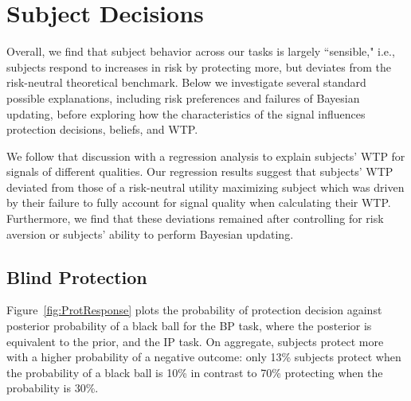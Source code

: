\section{Subject Decisions}\label{app:subtasks}



Overall, we find that subject behavior across our tasks is largely ``sensible," i.e., subjects respond to increases in risk by protecting more, but deviates from the risk-neutral theoretical benchmark.  Below we investigate several standard possible explanations, including risk preferences and failures of Bayesian updating, before exploring how the characteristics of the signal influences protection decisions, beliefs, and WTP.

We follow that discussion with a regression analysis to explain subjects' WTP for signals of different qualities. Our regression results suggest that subjects' WTP deviated from those of a risk-neutral utility maximizing subject which was driven by their failure to fully account for signal quality when calculating their WTP. Furthermore, we find that these deviations remained after controlling for risk aversion or subjects' ability to perform Bayesian updating. 




\subsection{Blind Protection}



 Figure~\ref{fig:ProtResponse} plots the probability of protection decision against posterior probability of a black ball for the BP task, where the posterior is equivalent to the prior, and the IP task. On aggregate, subjects protect more with a higher probability of a negative outcome: only 13\% subjects protect when the probability of a black ball is 10\% in contrast to 70\% protecting when the probability is 30\%. 

